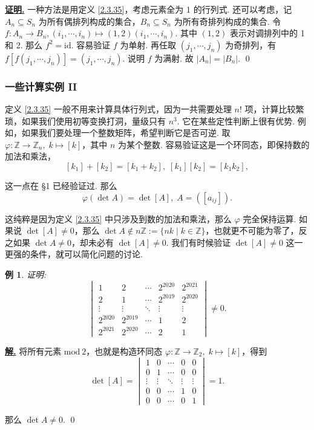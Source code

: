 \documentclass[10pt,openany]{article}
\theoremstyle{thmstyle} %
\theoremstyle{defstyle} %
\theoremstyle{prostyle} %
\theoremstyle{exastyle}
\newtheorem{example}[theorem]{例}
\theoremstyle{remstyle}
\renewenvironment{proof}[1][证明]{\par\underline{\textbf{#1.}} \;\fangsong}{\qed\par}
\newenvironment{solution}{\par\underline{\textbf{解.}} \;\fangsong}{\qed\par}
\begin{document}
\begin{proof}
	一种方法是用定义 \ref{2.3.35}，考虑元素全为 1 的行列式. 还可以考虑，记 \( A_n \subseteq S_n \) 为所有偶排列构成的集合，\( B_n \subseteq S_n \) 为所有奇排列构成的集合. 令 \( f:A_n \to B_n, (i_1,\cdots,i_n) \mapsto (1,2)(i_1,\cdots,i_n) \). 其中 \( (1,2) \) 表示对调排列中的 1 和 2. 那么 \( f^2=\mathrm{id} \). 容易验证 \( f \) 为单射. 再任取 \( (j_1,\cdots,j_n) \) 为奇排列，有 \( f[f(j_1,\cdots,j_n)]=(j_1,\cdots,j_n) \). 说明 \( f \) 为满射. 故 \( |A_n|=|B_n| \).
\end{proof}


\subsubsection{一些计算实例 II}

定义 \ref{2.3.35} 一般不用来计算具体行列式，因为一共需要处理 \( n! \) 项，计算比较繁琐，如果我们使用初等变换打洞，量级只有 \( n^3 \). 它在某些定性判断上很有优势. 例如，如果我们要处理一个整数矩阵，希望判断它是否可逆. 取 \( \varphi: \mathbb{Z} \to \mathbb{Z}_n, \; k \mapsto [k] \)，其中 \( n \) 为某个整数. 容易验证这是一个环同态，即保持数的加法和乘法，
\[ [k_1]+[k_2]=[k_1+k_2], \; [k_1][k_2]=[k_1k_2], \]

这一点在 \S 1 已经验证过. 那么 
\[ \varphi(\det A)= \det [A], \; A=([a_{ij}]). \]

这纯粹是因为定义 \ref{2.3.35} 中只涉及到数的加法和乘法，那么 \( \varphi \) 完全保持运算. 如果说 \( \det [A] \neq 0 \)，那么 \( \det A \notin n\mathbb{Z}:=\{nk \mid k \in \mathbb{Z} \} \)，也就更不可能为零了，反之如果 \( \det A \neq 0 \)，却未必有 \( \det [A] \neq 0 \). 我们有时候验证 \( \det [A] \neq 0 \) 这一更强的条件，就可以简化问题的讨论.


\begin{example} \label{2.3.37}
	证明: \[
	\begin{vmatrix}
		1 & 2 & \cdots & 2^{2020} & 2^{2021} \\
		2 & 1 & \cdots & 2^{2019} & 2^{2020} \\
		\vdots & \vdots & \ddots & \vdots & \vdots \\
		2^{2020} & 2^{2019} & \cdots & 1 & 2 \\
		2^{2021} & 2^{2020} & \cdots & 2 & 1
	\end{vmatrix} \neq 0.
	\]
\end{example}

\begin{solution}
	将所有元素 \( \text{mod} \ 2 \)，也就是构造环同态 \( \varphi: \mathbb{Z} \to \mathbb{Z}_2, \; k \mapsto [k] \)，得到
	\[ \det [A]=\begin{vmatrix}
		1 & 0 & \cdots & 0 & 0 \\
		0 & 1 & \cdots & 0 & 0 \\
		\vdots & \vdots & \ddots & \vdots & \vdots \\
		0 & 0 & \cdots & 1 & 0 \\
		0 & 0 & \cdots & 0 & 1
	\end{vmatrix}=1.  \]
	
	那么 \( \det A \neq 0 \).
\end{solution}
\end{document}
